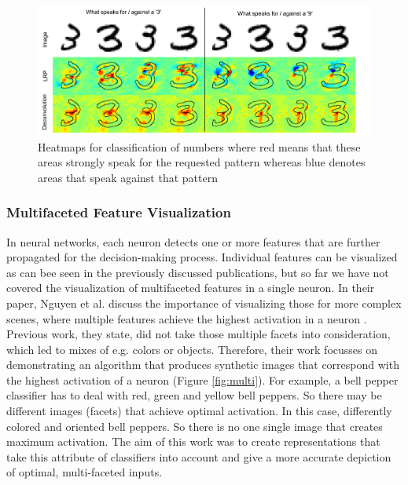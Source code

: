 \documentclass{acmsiggraph}               %
\begin{document}
\begin{figure}
\center
\includegraphics[width=\textwidth]{heatmap_samek_et_al}
\caption{Heatmaps for classification of numbers where red means that these areas strongly speak for the requested pattern whereas blue denotes areas that speak against that pattern \protect\cite{Samek2017}}
\label{fig:heatmap_numbers}
\end{figure}

\subsubsection{Multifaceted Feature Visualization}
In neural networks, each neuron detects one or more features that are further propagated for the decision-making process. 
Individual features can be visualized as can bee seen in the previously discussed publications, but so far we have not covered the visualization of multifaceted features in a single neuron. 
In their paper, Nguyen et al. discuss the importance of visualizing those for more complex scenes, where multiple features achieve the highest activation in a neuron \cite{Nguyen2016}. 
Previous work, they state, did not take those multiple facets into consideration, which led to mixes of e.g. colors or objects. 
Therefore, their work focusses on demonstrating an algorithm that produces synthetic images that correspond with the highest activation of a neuron (Figure \ref{fig:multi}). 
For example, a bell pepper classifier has to deal with red, green and yellow bell peppers. 
So there may be different images (facets) that achieve optimal activation. 
In this case, differently colored and oriented bell peppers. 
So there is no one single image that creates maximum activation. 
The aim of this work was to create representations that take this attribute of classifiers into account and give a more accurate depiction of optimal, multi-faceted inputs.
\end{document}
